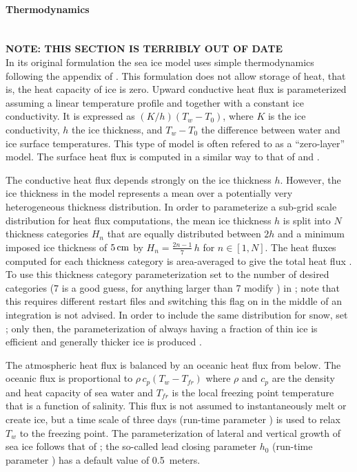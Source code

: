 \paragraph{Thermodynamics\label{sec:pkg:seaice:thermodynamics}}~\\
%
\noindent\textbf{NOTE: THIS SECTION IS TERRIBLY OUT OF DATE}\\
In its original formulation the sea ice model \citep{menemenlis05}
uses simple thermodynamics following the appendix of
\citet{sem76}. This formulation does not allow storage of heat,
that is, the heat capacity of ice is zero. Upward conductive heat flux
is parameterized assuming a linear temperature profile and together
with a constant ice conductivity. It is expressed as
$(K/h)(T_{w}-T_{0})$, where $K$ is the ice conductivity, $h$ the ice
thickness, and $T_{w}-T_{0}$ the difference between water and ice
surface temperatures. This type of model is often refered to as a
``zero-layer'' model. The surface heat flux is computed in a similar
way to that of \citet{parkinson79} and \citet{manabe79}. 

The conductive heat flux depends strongly on the ice thickness $h$.
However, the ice thickness in the model represents a mean over a
potentially very heterogeneous thickness distribution.  In order to
parameterize a sub-grid scale distribution for heat flux computations,
the mean ice thickness $h$ is split into $N$ thickness categories
$H_{n}$ that are equally distributed between $2h$ and a minimum
imposed ice thickness of $5\text{\,cm}$ by $H_n= \frac{2n-1}{7}\,h$
for $n\in[1,N]$. The heat fluxes computed for each thickness category
is area-averaged to give the total heat flux \citep{hibler84}. To use
this thickness category parameterization set  to
the number of desired categories (7 is a good guess, for anything
larger than 7 modify ) in
; note that this requires different restart files
and switching this flag on in the middle of an integration is not
advised. In order to include the same distribution for snow, set
; only then, the
parameterization of always having a fraction of thin ice is efficient
and generally thicker ice is produced \citep{castro-morales14}.


The atmospheric heat flux is balanced by an oceanic heat flux from
below.  The oceanic flux is proportional to
$\rho\,c_{p}\left(T_{w}-T_{fr}\right)$ where $\rho$ and $c_{p}$ are
the density and heat capacity of sea water and $T_{fr}$ is the local
freezing point temperature that is a function of salinity. This flux
is not assumed to instantaneously melt or create ice, but a time scale
of three days (run-time parameter ) is used
to relax $T_{w}$ to the freezing point.
%
The parameterization of lateral and vertical growth of sea ice follows
that of \citet{hib79, hib80}; the so-called lead closing parameter
$h_{0}$ (run-time parameter ) has a default value of
0.5~meters.

